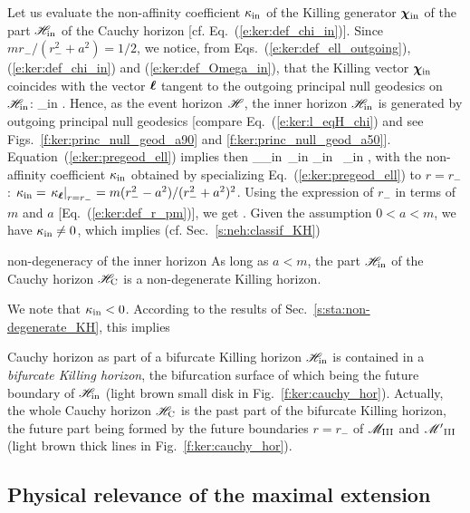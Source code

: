 Let us evaluate the non-affinity coefficient $\kappa_{\rm in}$ of the Killing
generator $\bm{\chi}_{\rm in}$ of the part $\mathscr{H}_{\rm in}$ of the
Cauchy horizon [cf. Eq.~(\ref{e:ker:def_chi_in})].
Since $m r_- /(r_-^2+a^2) = 1/2$,
we notice, from Eqs.~(\ref{e:ker:def_ell_outgoing}), (\ref{e:ker:def_chi_in}) and (\ref{e:ker:def_Omega_in}), that the Killing vector $\bm{\chi}_{\rm in}$ coincides with
the vector $\bm{\ell}$ tangent to the outgoing principal
null geodesics on $\mathscr{H}_{\rm in}$:
\be \label{e:ker:chi_in_ell}
    \w{\chi}_{\rm in}  \wl .
\ee
Hence, as the event horizon $\mathscr{H}$, the inner horizon $\mathscr{H}_{\rm in}$
is generated by outgoing principal null geodesics [compare Eq.~(\ref{e:ker:l_eqH_chi}) and
see Figs.~\ref{f:ker:princ_null_geod_a90} and \ref{f:ker:princ_null_geod_a50}].
Equation~(\ref{e:ker:pregeod_ell}) implies then
\be
     \wnab_{\w{\chi}_{\rm in}}\, \w{\chi}_{\rm in}  \kappa_{\rm in} \, \w{\chi}_{\rm in} ,
\ee
with the non-affinity coefficient $\kappa_{\rm in}$ obtained by specializing
Eq.~(\ref{e:ker:pregeod_ell}) to $r=r_-$:
$\kappa_{\rm in} = \left. \kappa_{\bm{\ell}} \right| _{r=r_-} =
    m(r_-^2-a^2)/(r_-^2+a^2)^2 $.
Using the expression of $r_-$ in terms of $m$ and $a$ [Eq.~(\ref{e:ker:def_r_pm})], we get
\be
     .
\ee
Given the assumption $0<a<m$, we have $\kappa_{\rm in} \not=0$, which implies
(cf. Sec.~\ref{s:neh:classif_KH})
\begin{tprop}{non-degeneracy of the inner horizon}{}
As long as $a<m$, the part $\mathscr{H}_{\rm in}$ of the Cauchy horizon $\mathscr{H}_{\rm C}$ is a non-degenerate Killing horizon.
\end{tprop}
We note that $\kappa_{\rm in} < 0$.
According to the results of Sec.~\ref{s:sta:non-degenerate_KH}, this implies
\begin{tprop}{Cauchy horizon as part of a bifurcate Killing horizon}{}
$\mathscr{H}_{\rm in}$ is contained in a \emph{bifurcate Killing horizon}, the
bifurcation surface of which being the future boundary of $\mathscr{H}_{\rm in}$
(light brown small disk in Fig.~\ref{f:ker:cauchy_hor}).
Actually, the whole Cauchy horizon $\mathscr{H}_{\rm C}$ is the past part of the bifurcate Killing horizon,
the future part being formed by the future
boundaries $r=r_-$ of $\mathscr{M}_{\rm III}$ and ${\mathscr{M}'}_{\rm III}$ (light brown thick lines in Fig.~\ref{f:ker:cauchy_hor}).
\end{tprop}

\subsection{Physical relevance of the maximal extension}

